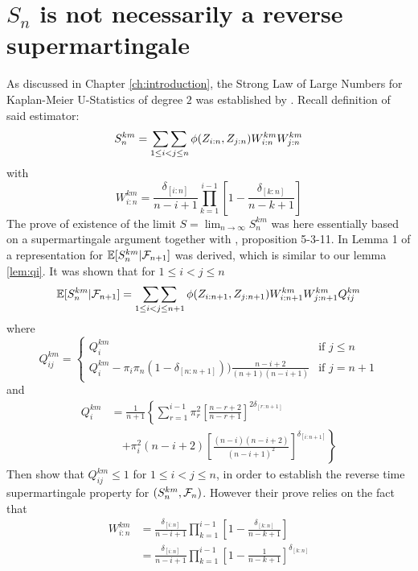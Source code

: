 \section{$S_n$ is not necessarily a reverse supermartingale} \label{sec:not_supermart}
As discussed in Chapter \ref{ch:introduction}, the Strong Law of Large Numbers for Kaplan-Meier U-Statistics of degree $2$ was established by \cite{bose1999strong}. Recall definition of said estimator: 
\begin{equation*}
	S_n^{km} = \mathop{\sum\sum}\limits_{1\leq i<j\leq n} \phi(Z_{i:n}, Z_{j:n}) W_{i:n}^{km} W_{j:n}^{km}
\end{equation*}
with
\begin{equation*}
	W_{i:n}^{km} = \frac{\delta_{[i:n]}}{n-i+1}\prod\limits_{k=1}^{i-1}\left[1-\frac{\delta_{[k:n]}}{n-k+1}\right]
\end{equation*}
The prove of existence of the limit $S = \lim_{n\to\infty} S_n^{km}$ was here essentially based on a supermartingale argument together with \cite{neveu1975discrete}, proposition 5-3-11. In Lemma 1 of \cite{bose1999strong} a representation for $\mathbb{E}[S_n^{km}| \mathcal{F}_{n+1}]$ was derived, which is similar to our lemma \ref{lem:qi}. It was shown that for $1\leq i<j\leq n$
$$\mathbb{E}[S_n^{km}|\mathcal{F}_{n+1}] = \mathop{\sum\sum}\limits_{1\leq i<j \leq n+1} \phi(Z_{i:n+1},Z_{j:n+1}) W_{i:n+1}^{km}W_{j:n+1}^{km}Q_{ij}^{km}$$
where 
\[Q_{ij}^{km} = \begin{cases} 
Q_i^{km} &\textrm{if } j\leq n \\
Q_i^{km} - \pi_i \pi_n (1-\delta_{[n:n+1]}))\frac{n-i+2}{(n+1)(n-i+1)} &\textrm{if } j=n+1
\end{cases}
\]
and
\begin{align*}
Q_i^{km} &= \frac{1}{n+1} \left\{ \sum\limits_{r=1}^{i-1} \pi_r^2 \left[ \frac{n-r+2}{n-r+1} \right]^{2\delta_{[r:n+1]}} \right.\\
		 & \quad \left. + \pi_i^2 (n-i+2) \left[\frac{(n-i)(n-i+2)}{(n-i+1)^2}\right]^{\delta_{[i:n+1]}} \right\}
\end{align*}
Then \cite{bose1999strong} show that $Q_{ij}^{km}\leq 1$ for $1\leq i<j\leq n$, in order to establish the reverse time supermartingale property for $(S_n^{km}, \mathcal{F}_n)$. However their prove relies on the fact that 
\begin{align*}
	W_{i:n}^{km} &= \frac{\delta_{[i:n]}}{n-i+1}\prod\limits_{k=1}^{i-1}\left[1-\frac{\delta_{[k:n]}}{n-k+1}\right] \\
				 &= \frac{\delta_{[i:n]}}{n-i+1}\prod\limits_{k=1}^{i-1}\left[1-\frac{1}{n-k+1}\right]^{\delta_{[k:n]}}
\end{align*}
